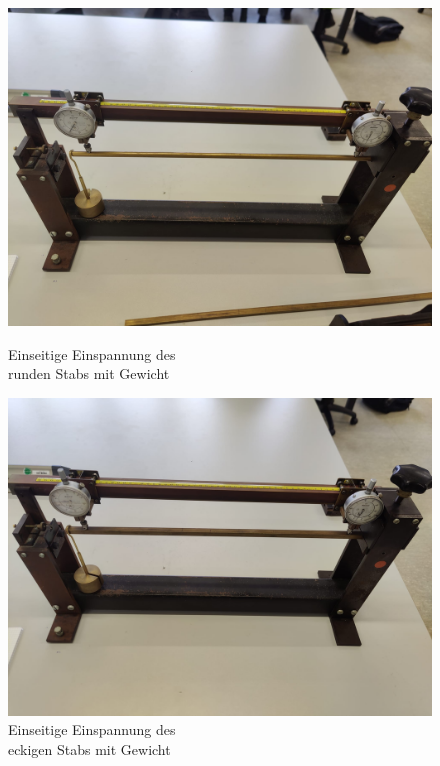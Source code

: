 \begin{figure}[h]
    \centering
    \begin{minipage}{0.45\textwidth}
        \centering
        \includegraphics[width=\textwidth]{Bilder/emG2.jpg}
        \caption{Einseitige Einspannung des \\ runden Stabs mit Gewicht}
    \end{minipage}
    \hfill
    \begin{minipage}{0.45\textwidth}
        \centering
        \includegraphics[width=\textwidth]{Bilder/emG.jpg}
        \caption{Einseitige Einspannung des \\ eckigen Stabs mit Gewicht}
    \end{minipage}
\end{figure}
